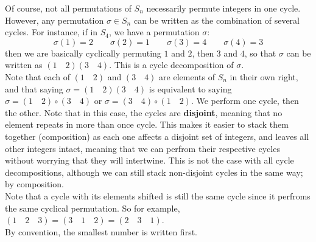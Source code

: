 \documentclass[12pt]{article}
\begin{document}
    Of course, not all permutations of $S_n$
    necessarily permute integers in one cycle.
    However, any permutation $\sigma \in S_n$
    can be written as the combination of several cycles.
    For instance, if in $S_4$, we have a permutation $\sigma$:
    \[ \sigma(1) = 2
    \qquad \sigma(2) = 1
    \qquad \sigma(3) = 4
    \qquad \sigma(4) = 3 \]
    then we are basically cyclically permuting $1$ and $2$,
    then $3$ and $4$,
    so that $\sigma$ can be written as $(1 \quad 2)(3 \quad 4)$. 
    This is a cycle decomposition of $\sigma$. \\
    Note that each of $(1 \quad 2)$ and $(3 \quad 4)$
    are elements of $S_n$ in their own right,
    and that saying $\sigma = (1 \quad 2)(3 \quad 4)$
    is equivalent to saying $\sigma = (1 \quad 2) \circ (3 \quad 4)$
    or  $\sigma = (3 \quad 4) \circ (1 \quad 2)$.
    We perform one cycle, then the other.
    Note that in this case, the cycles are \textbf{disjoint},
    meaning that no element repeats in more than once cycle.
    This makes it easier to stack them together (composition)
    as each one affects a disjoint set of integers,
    and leaves all other integers intact,
    meaning that we can perfrom their respective cycles
    without worrying that they will intertwine.
    This is not the case with all cycle decompositions,
    although we can still stack non-disjoint cycles
    in the same way; by composition. \\

    Note that a cycle with its elements shifted is still the same
    cycle since it perfroms the same cyclical permutation.
    So for example, $(1 \quad 2 \quad 3) =
    (3 \quad 1 \quad 2) = (2 \quad 3 \quad 1)$. \\
    By convention, the smallest number is written first. \\
\end{document}
